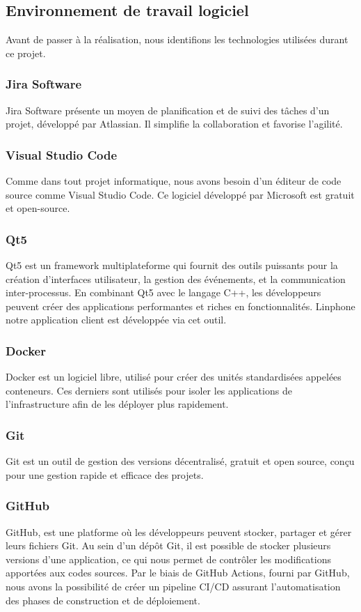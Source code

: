 \subsection{Environnement de travail logiciel}
Avant de passer à la réalisation, nous identifions les technologies utilisées durant ce projet.

\subsubsection{Jira Software}
Jira Software présente un moyen de planification et de suivi des tâches d'un projet, développé par Atlassian. Il simplifie la collaboration et favorise l'agilité.

\subsubsection{Visual Studio Code}
Comme dans tout projet informatique, nous avons besoin d'un éditeur de code source comme Visual Studio Code. Ce logiciel développé par Microsoft est gratuit et open-source.

\subsubsection{Qt5}
Qt5 est un framework multiplateforme qui fournit des outils puissants pour la création d'interfaces utilisateur, la gestion des événements, et la communication inter-processus. En combinant Qt5 avec le langage C++, les développeurs peuvent créer des applications performantes et riches en fonctionnalités. Linphone notre application client est développée via cet outil.

\subsubsection{Docker}
Docker est un logiciel libre, utilisé pour créer des unités standardisées appelées conteneurs. Ces derniers sont utilisés pour isoler les applications de l’infrastructure afin de les déployer plus rapidement.

\subsubsection{Git}
Git est un outil de gestion des versions décentralisé, gratuit et open source, conçu pour une gestion rapide et efficace des projets.

\subsubsection{GitHub}
GitHub, est une platforme où les développeurs peuvent stocker, partager et gérer leurs fichiers Git. Au sein d’un dépôt Git, il est possible de stocker plusieurs versions d’une application, ce qui nous permet de contrôler les modifications apportées aux codes sources. Par le biais de GitHub Actions, fourni par GitHub, nous avons la possibilité de créer un pipeline CI/CD assurant l’automatisation des phases de construction et de déploiement.


